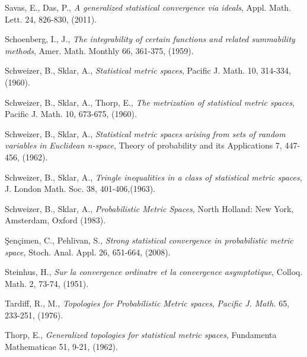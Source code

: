 \documentclass[reqno,b5paper]{amsart}
\theoremstyle{plain}
\theoremstyle{definition}
\begin{document}
\begin{thebibliography}{99}
 Savas, E., Das, P., \textit{A generalized statistical convergence via ideals}, Appl. Math. Lett. 24, 826-830, (2011).

 Schoenberg, I., J., \textit{The integrability of certain functions and related summability methods},  Amer. Math.
Monthly 66, 361-375, (1959).

 Schweizer, B., Sklar, A., \textit{Statistical metric spaces}, Pacific J. Math. 10, 314-334, (1960).

 Schweizer, B., Sklar, A., Thorp, E., \textit{The metrization of statistical metric spaces}, Pacific J. Math. 10, 673-675, (1960).

 Schweizer, B., Sklar, A., \textit{Statistical metric spaces arising from sets of random variables in Euclidean n-space}, Theory of probability and its Applications 7, 447-456, (1962).

 Schweizer, B., Sklar, A., \textit{Tringle inequalities in a class of statistical metric spaces}, J. London Math. Soc. 38, 401-406,(1963).

 Schweizer, B., Sklar, A., \textit{Probabilistic Metric Spaces}, North Holland: New York, Amsterdam, Oxford (1983).

 \c{S}en\c{c}imen, C., Pehlivan, S., \textit{Strong statistical convergence in probabilistic metric space}, Stoch. Anal. Appl. 26, 651-664, (2008).



 Steinhus, H., \textit{Sur la convergence ordinatre et la convergence asymptotique}, Colloq. Math. 2, 73-74, (1951).



  Tardiff, R., M., \textit{Topologies for Probabilistic Metric spaces}, \textit{Pacific J. Math.} 65, 233-251, (1976).

 Thorp, E., \textit{Generalized topologies for statistical metric spaces}, Fundamenta Mathematicae 51, 9-21, (1962).

\end{thebibliography}
\end{document}
